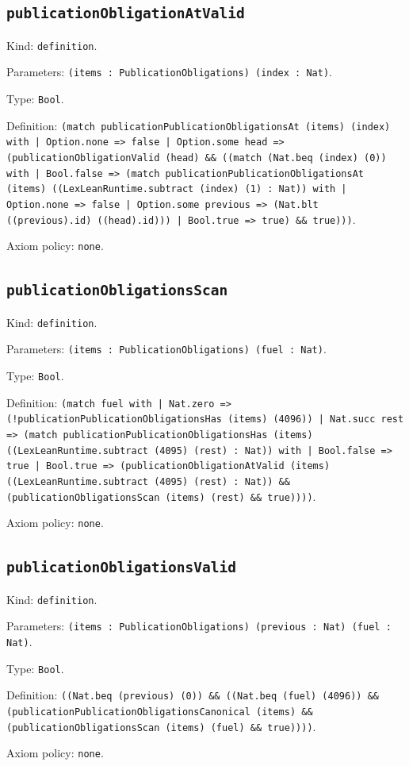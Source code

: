 \documentclass[11pt]{article}
\begin{document}
\subsection*{\texttt{publicationObligationAtValid}}
\noindent Kind: \texttt{definition}.\par
\noindent Parameters: \texttt{(items : PublicationObligations) (index : Nat)}.\par
\noindent Type: \texttt{Bool}.\par
\noindent Definition: \texttt{(match publicationPublicationObligationsAt (items) (index) with | Option.none => false | Option.some head => (publicationObligationValid (head) \&\& ((match (Nat.beq (index) (0)) with | Bool.false => (match publicationPublicationObligationsAt (items) ((LexLeanRuntime.subtract (index) (1) : Nat)) with | Option.none => false | Option.some previous => (Nat.blt ((previous).id) ((head).id))) | Bool.true => true) \&\& true)))}.\par
\noindent Axiom policy: \texttt{none}.\par
\subsection*{\texttt{publicationObligationsScan}}
\noindent Kind: \texttt{definition}.\par
\noindent Parameters: \texttt{(items : PublicationObligations) (fuel : Nat)}.\par
\noindent Type: \texttt{Bool}.\par
\noindent Definition: \texttt{(match fuel with | Nat.zero => (!publicationPublicationObligationsHas (items) (4096)) | Nat.succ rest => (match publicationPublicationObligationsHas (items) ((LexLeanRuntime.subtract (4095) (rest) : Nat)) with | Bool.false => true | Bool.true => (publicationObligationAtValid (items) ((LexLeanRuntime.subtract (4095) (rest) : Nat)) \&\& (publicationObligationsScan (items) (rest) \&\& true))))}.\par
\noindent Axiom policy: \texttt{none}.\par
\subsection*{\texttt{publicationObligationsValid}}
\noindent Kind: \texttt{definition}.\par
\noindent Parameters: \texttt{(items : PublicationObligations) (previous : Nat) (fuel : Nat)}.\par
\noindent Type: \texttt{Bool}.\par
\noindent Definition: \texttt{((Nat.beq (previous) (0)) \&\& ((Nat.beq (fuel) (4096)) \&\& (publicationPublicationObligationsCanonical (items) \&\& (publicationObligationsScan (items) (fuel) \&\& true))))}.\par
\noindent Axiom policy: \texttt{none}.\par
\end{document}
